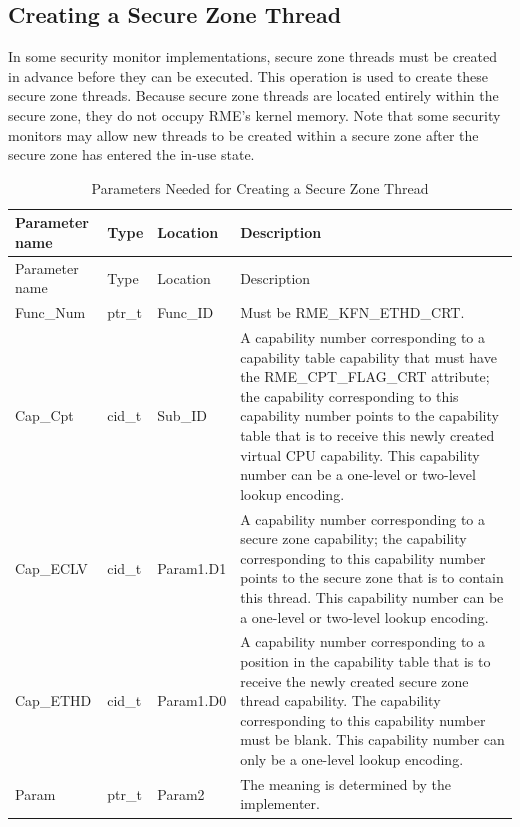 \subsection{Creating a Secure Zone Thread}\label{subsec:8-create-enclave-thread}

In some security monitor implementations, secure zone threads must be created in advance before they can be executed. This operation is used to create these secure zone threads. Because secure zone threads are located entirely within the secure zone, they do not occupy RME's kernel memory. Note that some security monitors may allow new threads to be created within a secure zone after the secure zone has entered the in-use state.

\begin{xltabular}{\textwidth}{@{}>{\hsize\raggedright\arraybackslash}X>{\hsize\raggedright\arraybackslash}X>{\hsize\raggedright\arraybackslash}X>{\hsize\raggedright\arraybackslash}X@{}}
\caption{Parameters Needed for Creating a Secure Zone Thread}\label{tab:8-100-create-enclave-thread-parameters}\\
\toprule
Parameter name & Type & Location & Description\tabularnewline
\endfirsthead
\toprule
Parameter name & Type & Location & Description\tabularnewline
\midrule
\endhead
\bottomrule
\endlastfoot
Func\_Num & ptr\_t & Func\_ID &
Must be RME\_KFN\_ETHD\_CRT.\tabularnewline
Cap\_Cpt & cid\_t & Sub\_ID &
A capability number corresponding to a capability table capability that must have the RME\_CPT\_FLAG\_CRT attribute; the capability corresponding to this capability number points to the capability table that is to receive this newly created virtual CPU capability. This capability number can be a one-level or two-level lookup encoding.\tabularnewline
Cap\_ECLV & cid\_t & Param1.D1 &
A capability number corresponding to a secure zone capability; the capability corresponding to this capability number points to the secure zone that is to contain this thread. This capability number can be a one-level or two-level lookup encoding.\tabularnewline
Cap\_ETHD & cid\_t & Param1.D0 &
A capability number corresponding to a position in the capability table that is to receive the newly created secure zone thread capability. The capability corresponding to this capability number must be blank. This capability number can only be a one-level lookup encoding.\tabularnewline
Param & ptr\_t & Param2 & The meaning is determined by the implementer.\tabularnewline
\end{xltabular}
\nopagebreak[4]

